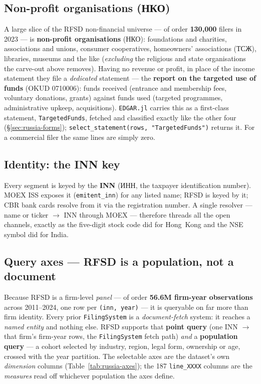 \documentclass[11pt,a4paper]{report}
\newcommand{\rus}[1]{{\rusfont #1}}
\begin{document}
\subsection{Non-profit organisations (\rus{НКО})}
A large slice of the RFSD non-financial universe --- of order \textbf{130{,}000} filers in 2023 --- is
\textbf{non-profit organisations} (\rus{НКО}): foundations and charities, associations and unions, consumer
cooperatives, homeowners' associations (\rus{ТСЖ}), libraries, museums and the like (\emph{excluding} the
religious and state organisations the carve-out above removes). Having no revenue or profit, in place of the
income statement they file a \emph{dedicated} statement --- the \textbf{report on the targeted use of funds}
(OKUD 0710006): funds received (entrance and membership fees, voluntary donations, grants) against funds used
(targeted programmes, administrative upkeep, acquisitions). \texttt{EDGAR.jl} carries this as a first-class
statement, \texttt{TargetedFunds}, fetched and classified exactly like the other four (\S\ref{sec:russia-forms});
\texttt{select\_statement(rows, "TargetedFunds")} returns it. For a commercial filer the same lines are simply
zero.

\subsection{Identity: the INN key}
Every segment is keyed by the \textbf{INN} (\rus{ИНН}, the taxpayer identification number). MOEX ISS exposes it
(\texttt{emitent\_inn}) for any listed name; RFSD is keyed by it; CBR bank cards resolve from it via the
registration number. A single resolver --- name or ticker $\to$ INN through MOEX --- therefore threads all the
open channels, exactly as the five-digit stock code did for Hong~Kong and the NSE symbol did for India.

\subsection{Query axes --- RFSD is a population, not a document}\label{sec:russia-axes}
Because RFSD is a firm-level \emph{panel} --- of order \textbf{56.6M firm-year observations} across
2011--2024, one row per \texttt{(inn, year)} --- it is queryable on far more than firm identity. Every prior
\texttt{FilingSystem} is a \emph{document-fetch} system: it reaches a \emph{named entity} and nothing else.
RFSD supports that \textbf{point query} (one INN $\to$ that firm's firm-year rows, the \texttt{FilingSystem}
fetch path) \emph{and} a \textbf{population query} --- a cohort selected by industry, region, legal form,
ownership or age, crossed with the year partition. The selectable axes are the dataset's own \emph{dimension}
columns (Table~\ref{tab:russia-axes}); the 187 \texttt{line\_XXXX} columns are the \emph{measures} read off
whichever population the axes define.
\end{document}
